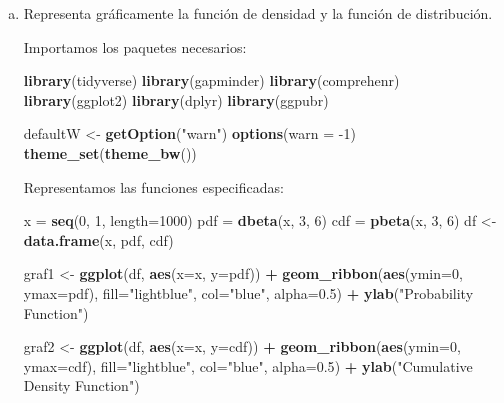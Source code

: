 \documentclass[a4paper]{article}
\newenvironment{Shaded}{\begin{snugshade}}{\end{snugshade}}
\newcommand{\DataTypeTok}[1]{\textcolor[rgb]{0.13,0.29,0.53}{#1}}
\newcommand{\DecValTok}[1]{\textcolor[rgb]{0.00,0.00,0.81}{#1}}
\newcommand{\FloatTok}[1]{\textcolor[rgb]{0.00,0.00,0.81}{#1}}
\newcommand{\KeywordTok}[1]{\textcolor[rgb]{0.13,0.29,0.53}{\textbf{#1}}}
\newcommand{\NormalTok}[1]{#1}
\newcommand{\OperatorTok}[1]{\textcolor[rgb]{0.81,0.36,0.00}{\textbf{#1}}}
\newcommand{\StringTok}[1]{\textcolor[rgb]{0.31,0.60,0.02}{#1}}
\begin{document}
\begin{enumerate}[a)]
	\item Representa gráficamente la función de densidad y la función de distribución.

	Importamos los paquetes necesarios:

\begin{Shaded}
\begin{Highlighting}[]
\KeywordTok{library}\NormalTok{(tidyverse)}
\KeywordTok{library}\NormalTok{(gapminder)}
\KeywordTok{library}\NormalTok{(comprehenr)}
\KeywordTok{library}\NormalTok{(ggplot2)}
\KeywordTok{library}\NormalTok{(dplyr)}
\KeywordTok{library}\NormalTok{(ggpubr)}

\NormalTok{defaultW <-}\StringTok{ }\KeywordTok{getOption}\NormalTok{(}\StringTok{"warn"}\NormalTok{)}
\KeywordTok{options}\NormalTok{(}\DataTypeTok{warn =} \DecValTok{-1}\NormalTok{)}
\KeywordTok{theme_set}\NormalTok{(}\KeywordTok{theme_bw}\NormalTok{())}
\end{Highlighting}
\end{Shaded}

	Representamos las funciones especificadas:

\begin{Shaded}
\begin{Highlighting}[]
\NormalTok{x =}\StringTok{ }\KeywordTok{seq}\NormalTok{(}\DecValTok{0}\NormalTok{, }\DecValTok{1}\NormalTok{, }\DataTypeTok{length=}\DecValTok{1000}\NormalTok{)}
\NormalTok{pdf =}\StringTok{ }\KeywordTok{dbeta}\NormalTok{(x, }\DecValTok{3}\NormalTok{, }\DecValTok{6}\NormalTok{)}
\NormalTok{cdf =}\StringTok{ }\KeywordTok{pbeta}\NormalTok{(x, }\DecValTok{3}\NormalTok{, }\DecValTok{6}\NormalTok{)}
\NormalTok{df <-}\StringTok{ }\KeywordTok{data.frame}\NormalTok{(x, pdf, cdf)}

\NormalTok{graf1 <-}\StringTok{ }\KeywordTok{ggplot}\NormalTok{(df, }\KeywordTok{aes}\NormalTok{(}\DataTypeTok{x=}\NormalTok{x, }\DataTypeTok{y=}\NormalTok{pdf)) }\OperatorTok{+}
\StringTok{  }\KeywordTok{geom_ribbon}\NormalTok{(}\KeywordTok{aes}\NormalTok{(}\DataTypeTok{ymin=}\DecValTok{0}\NormalTok{, }\DataTypeTok{ymax=}\NormalTok{pdf), }\DataTypeTok{fill=}\StringTok{"lightblue"}\NormalTok{, }\DataTypeTok{col=}\StringTok{"blue"}\NormalTok{, }\DataTypeTok{alpha=}\FloatTok{0.5}\NormalTok{) }\OperatorTok{+}
\StringTok{  }\KeywordTok{ylab}\NormalTok{(}\StringTok{"Probability  Function"}\NormalTok{)}

\NormalTok{graf2 <-}\StringTok{ }\KeywordTok{ggplot}\NormalTok{(df, }\KeywordTok{aes}\NormalTok{(}\DataTypeTok{x=}\NormalTok{x, }\DataTypeTok{y=}\NormalTok{cdf)) }\OperatorTok{+}
\StringTok{  }\KeywordTok{geom_ribbon}\NormalTok{(}\KeywordTok{aes}\NormalTok{(}\DataTypeTok{ymin=}\DecValTok{0}\NormalTok{, }\DataTypeTok{ymax=}\NormalTok{cdf), }\DataTypeTok{fill=}\StringTok{"lightblue"}\NormalTok{, }\DataTypeTok{col=}\StringTok{"blue"}\NormalTok{, }\DataTypeTok{alpha=}\FloatTok{0.5}\NormalTok{) }\OperatorTok{+}
\StringTok{  }\KeywordTok{ylab}\NormalTok{(}\StringTok{"Cumulative Density Function"}\NormalTok{)}


\end{Highlighting}
\end{Shaded}
\end{enumerate}
\end{document}
